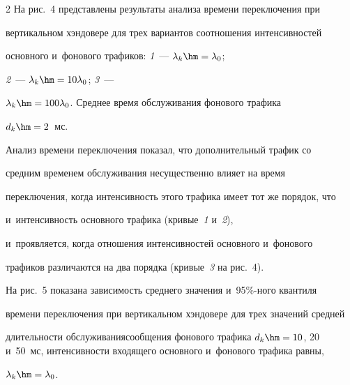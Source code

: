 \begin{multicols}{2}
  На рис.~4 представлены результаты анализа времени переключения при 


вертикальном хэндовере для трех вариантов соотношения интенсивностей 


основного и~фонового трафиков: \textit{1}~--- $\lambda_k\hm=\lambda_0$; 


\textit{2}~--- $\lambda_k\hm=10\lambda_0$; \textit{3}~--- 


$\lambda_k\hm=100\lambda_0$. Среднее время обслуживания фонового трафика 


$d_k\hm=2$~мс.


  








  


  Анализ времени переключения показал, что дополнительный трафик со 


средним временем обслуживания несущественно влияет на время 


переключения, когда интенсивность этого трафика имеет тот же порядок, что 


и~интенсивность основного трафика (кривые~\textit{1} и~\textit{2}), 


и~проявляется, когда отношения интенсивностей основного и~фонового 


трафиков различаются на два порядка (кривые~\textit{3} на рис.~4).


  


  





На рис.~5 показана зависимость среднего значе\-ния и~95\%-ного квантиля 


времени переклю\-чения при вертикальном хэндовере для трех значений средней 


длительности обслуживания\linebreak сообщения фонового трафика $d_k\hm=10$, 20 и~50~мс, интенсивности входящего основного и~фонового трафика равны, 


$\lambda_k\hm= \lambda_0$.





\setcounter{figure}{4}





\begin{figure} %



\end{figure}
\end{multicols}
